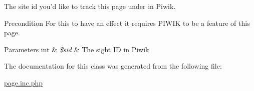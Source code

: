 The site id you'd like to track this page under in Piwik. 

\begin{DoxyPrecond}{Precondition}
For this to have an effect it requires P\-I\-W\-I\-K to be a feature of this page. 
\end{DoxyPrecond}

\begin{DoxyParams}[1]{Parameters}
int & {\em \$sid} & The sight I\-D in Piwik \\
\hline
\end{DoxyParams}


The documentation for this class was generated from the following file\-:\begin{DoxyCompactItemize}
\item 
\hyperlink{page_8inc_8php}{page.\-inc.\-php}\end{DoxyCompactItemize}

